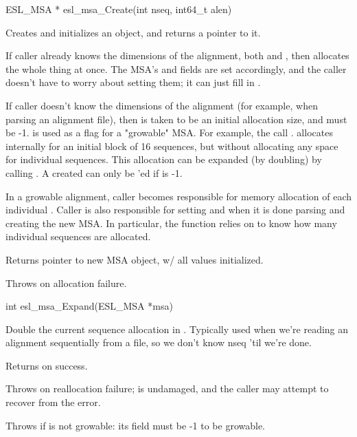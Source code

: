 \begin{sreapi}
\hypertarget{func:esl_msa_Create()}
{\item[ESL\_MSA * esl\_msa\_Create(int nseq, int64\_t alen)]}

Creates and initializes an  object, and returns a
pointer to it. 

If caller already knows the dimensions of the alignment,
both  and , then  allocates the whole thing at once. The MSA's
 and  fields are set accordingly, and the
caller doesn't have to worry about setting them; it can
just fill in .

If caller doesn't know the dimensions of the alignment
(for example, when parsing an alignment file), then
 is taken to be an initial allocation size, and
 must be -1.  is used as a flag for a
"growable" MSA. For example, the call .  allocates internally for an
initial block of 16 sequences, but without allocating
any space for individual sequences.  This allocation can
be expanded (by doubling) by calling .
A created  can only be 'ed if  is
-1.

In a growable alignment, caller becomes responsible for
memory allocation of each individual . Caller
is also responsible for setting  and  when
it is done parsing and creating the new MSA. In
particular, the  function relies on
 to know how many individual sequences are
allocated.

Returns pointer to new MSA object, w/ all values initialized.

Throws  on allocation failure.          


\hypertarget{func:esl_msa_Expand()}
{\item[int esl\_msa\_Expand(ESL\_MSA *msa)]}

Double the current sequence allocation in .
Typically used when we're reading an alignment sequentially 
from a file, so we don't know nseq 'til we're done.

Returns  on success.

Throws  on reallocation failure;  is undamaged,
and the caller may attempt to recover from the error.

Throws  if  is not growable: its 
field must be -1 to be growable.




\end{sreapi}

